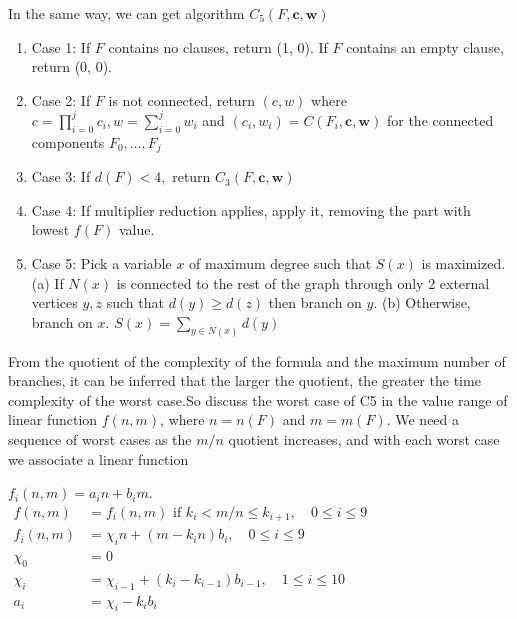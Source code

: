 \documentclass{sigchi}
\begin{document}
In the same way, we can get	algorithm $C_{5}(F, \mathbf{c}, \mathbf{w})$
\begin{enumerate}
	\item Case 1: If $F$ contains no clauses, return (1, 0). If $F$ contains an empty clause, return (0, 0).
	\item Case 2: If $F$ is not connected, return $(c, w)$ where $c=\prod_{i=0}^{j} c_{i}, w=\sum_{i=0}^{j} w_{i}$ and $\left(c_{i}, w_{i}\right)=C\left(F_{i}, \mathbf{c}, \mathbf{w}\right)$ for the connected components $F_{0}, \ldots, F_{j}$
	\item Case 3: If $d(F)<4,$ return $C_{3}(F, \mathbf{c}, \mathbf{w})$ 
	\item Case 4: If multiplier reduction applies, apply it, removing the part with lowest $f(F)$ value.
	\item Case 5: Pick a variable $x$ of maximum degree such that $S(x)$ is maximized. (a) If $N(x)$ is connected to the rest of the graph through only 2 external vertices $y, z$ such that $d(y) \geqslant d(z)$ then branch on $y .$
	(b) Otherwise, branch on $x .$
	$S(x)=\sum_{y \in N(x)} d(y)$
\end{enumerate}
From the quotient of the complexity of the formula and the maximum number of branches, it can be inferred that the larger the quotient, the greater the time complexity of the worst case.So discuss the worst case of C5 in the value range of linear function $f\left(n,m\right)$, where $n=n(F)$ and $m=m(F)$. 
We need a sequence of worst cases as the $m / n$ quotient increases, and with each worst case we associate a linear function 
\begin{center}
	$f_{i}(n, m)=a_{i} n+b_{i} m$. \\
	$\begin{aligned} f(n, m) &=f_{i}(n, m) \text { if } k_{i}<m / n \leqslant k_{i+1}, \quad 0 \leqslant i \leqslant 9 \\ f_{i}(n, m) &=\chi_{i} n+\left(m-k_{i} n\right) b_{i}, \quad 0 \leqslant i \leqslant 9 \\ \chi_{0} &=0 \\ \chi_{i} &=\chi_{i-1}+\left(k_{i}-k_{i-1}\right) b_{i-1}, \quad 1 \leqslant i \leqslant 10 \\ a_{i} &=\chi_{i}-k_{i} b_{i} \end{aligned}$\\
\end{center}
\end{document}
